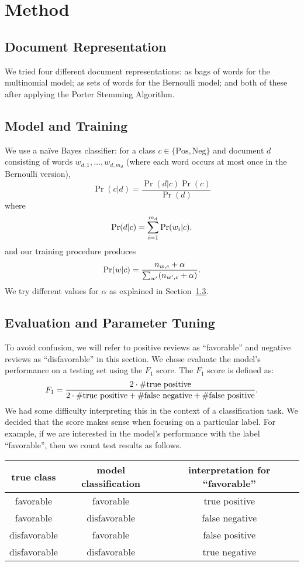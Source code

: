 \documentclass{article}
\newcommand{\PosC}{\mathrm{Pos}}
\newcommand{\NegC}{\mathrm{Neg}}
\begin{document}
\section{Method}

\subsection{Document Representation}

We tried four different document representations: as bags of words for the multinomial model; as sets of words for the Bernoulli model; and both of these after applying the Porter Stemming Algorithm.

\subsection{Model and Training}

We use a na\"ive Bayes classifier: for a class \(c \in \{\PosC, \NegC\}\) and document \(d\) consisting of words \(w_{d,1},\dotsc,w_{d,m_d}\) (where each word occurs at most once in the Bernoulli version),
\[\Pr(c|d)=\frac{\Pr(d|c)\Pr(c)}{\Pr(d)}\]
where
\[\Pr(d|c)=\sum_{i=1}^{m_d}\Pr(w_i|c)\ldotp\]
and our training procedure produces
\[\Pr(w|c)=\frac{n_{w,c}+\alpha}{\sum_{w'}(n_{w',c}+\alpha)}\ldotp\]
We try different values for \(\alpha\) as explained in Section~\ref{sec:EvalAndTuning}.

\subsection{Evaluation and Parameter Tuning}
\label{sec:EvalAndTuning}

To avoid confusion, we will refer to positive reviews as ``favorable'' and negative reviews as ``disfavorable'' in this section.  We chose evaluate the model's performance on a testing set using the \(F_1\) score.  The \(F_1\) score is defined as:
\[
  F_1=
  \frac
      {2\cdot\#\text{true positive}}
      {2\cdot\#\text{true positive}+\#\text{false negative}+\#\text{false positive}}
  \ldotp
\]
We had some difficulty interpreting this in the context of a classification task.
We decided that the score makes sense when focusing on a particular label.
For example, if we are interested in the model's performance with the label ``favorable'', then we count test results as follows.

\begin{tabular}{c|c|c}
  true class & model classification & interpretation for ``favorable'' \\
  \hline
  favorable & favorable & true positive \\
  favorable & disfavorable & false negative \\
  disfavorable & favorable & false positive \\
  disfavorable & disfavorable & true negative \\
\end{tabular}
\end{document}
